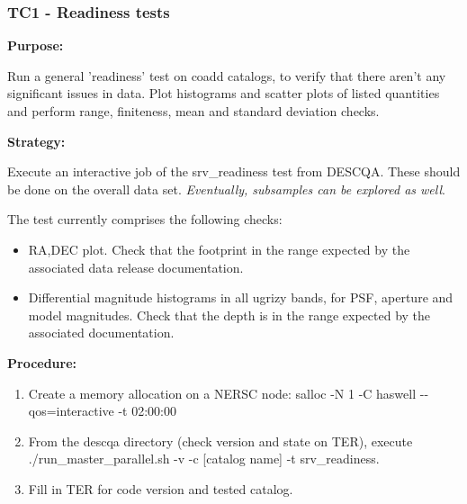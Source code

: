 \documentclass[11pt, a4paper]{article}
\begin{document}





\subsubsection{TC1 - Readiness tests}
\textbf{Purpose:} 

Run a general 'readiness' test on coadd catalogs, to verify that there aren't any significant issues in data. Plot histograms and scatter plots of listed quantities and perform range, finiteness, mean and standard deviation checks.

\textbf{Strategy:} 

Execute an interactive job of the srv\_readiness test from DESCQA. These should be done on the overall data set.  \textit{Eventually, subsamples can be explored as well}.

The test currently comprises the following checks:
\begin{itemize}
	\item RA,DEC plot. Check that the footprint in the range expected by the associated data release documentation.
	\item Differential magnitude histograms in all ugrizy bands, for PSF, aperture and model magnitudes. Check that the depth is in the range expected by the associated documentation.
\end{itemize}

\textbf{Procedure:} 

\begin{enumerate}
	\item Create a memory allocation on a NERSC node: salloc -N 1 -C haswell -{}-qos=interactive -t 02:00:00
	\item From the descqa directory (check version and state on TER), execute ./run\_master\_parallel.sh -v -c [catalog name] -t srv\_readiness. 
	\item Fill in TER for code version and tested catalog.
\end{enumerate}
\end{document}
